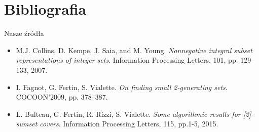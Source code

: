 \documentclass{beamer}
\begin{document}
\section{Bibliografia}
	\begin{frame}{Nasze źródła}
		\begin{itemize}
			\item M.J. Collins, D. Kempe, J. Saia, and M. Young. \textit{Nonnegative integral
subset representations of integer sets}. Information Processing Letters, 101, pp. 129–133, 2007.
			\item I. Fagnot, G. Fertin, S. Vialette. \textit{On finding small 2-generating sets}. COCOON'2009, pp. 378–387.
			\item L. Bulteau, G. Fertin, R. Rizzi, S. Vialette. \textit{Some algorithmic results
for [2]-sumset covers}. Information Processing Letters, 115, pp.1-5, 2015.
		\end{itemize}
	\end{frame}
	
\end{document}
